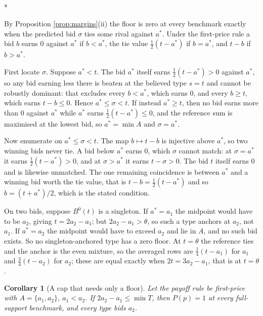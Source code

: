 \documentclass[12pt]{article}
\makeatletter
\newtheorem{corollary}{Corollary}
\theoremstyle{definition}
\renewenvironment{proof}[1][\proofname]{\par
  \pushQED{\qed}%
  \normalfont \topsep6\p@\@plus6\p@\relax
  \trivlist
  \item[\hskip\labelsep\itshape #1\@addpunct{.}]\mbox{}\\*
  \ignorespaces
}{%
  \popQED\endtrivlist\@endpefalse
}
\makeatother
\begin{document}
\begin{proof}[Proof of Corollary \ref{cor:fpmargins}]
By Proposition \ref{prop:margins}(ii) the floor is zero at every benchmark exactly when the predicted bid $\sigma$ ties some rival against $a^*$. Under the first-price rule a bid $b$ earns $0$ against $a^*$ if $b < a^*$, the tie value $\tfrac12(t - a^*)$ if $b = a^*$, and $t - b$ if $b > a^*$.

First locate $\sigma$. Suppose $a^* < t$. The bid $a^*$ itself earns $\tfrac12(t - a^*) > 0$ against $a^*$, so any bid earning less there is beaten at the believed type $s = t$ and cannot be robustly dominant: that excludes every $b < a^*$, which earns $0$, and every $b \ge t$, which earns $t - b \le 0$. Hence $a^* \le \sigma < t$. If instead $a^* \ge t$, then no bid earns more than $0$ against $a^*$ while $a^*$ earns $\tfrac12(t-a^*) \le 0$, and the reference sum is maximised at the lowest bid, so $a^* = \min A$ and $\sigma = a^*$.

Now enumerate on $a^* \le \sigma < t$. The map $b \mapsto t - b$ is injective above $a^*$, so two winning bids never tie. A bid below $a^*$ earns $0$, which $\sigma$ cannot match: at $\sigma = a^*$ it earns $\tfrac12(t-a^*) > 0$, and at $\sigma > a^*$ it earns $t - \sigma > 0$. The bid $t$ itself earns $0$ and is likewise unmatched. The one remaining coincidence is between $a^*$ and a winning bid worth the tie value, that is $t - b = \tfrac12(t - a^*)$ and so $b = (t + a^*)/2$, which is the stated condition.

On two bids, suppose $B^0(t)$ is a singleton. If $a^* = a_1$ the midpoint would have to be $a_2$, giving $t = 2a_2 - a_1$; but $2a_2 - a_1 > \theta$, so such a type anchors at $a_2$, not $a_1$. If $a^* = a_2$ the midpoint would have to exceed $a_2$ and lie in $A$, and no such bid exists. So no singleton-anchored type has a zero floor. At $t = \theta$ the reference ties and the anchor is the even mixture, so the averaged rows are $\tfrac14(t - a_1)$ for $a_1$ and $\tfrac34(t - a_2)$ for $a_2$; these are equal exactly when $2t = 3a_2 - a_1$, that is at $t = \theta$.
\end{proof}

\begin{corollary}[A cap that needs only a floor]\label{cor:floor}
Let the payoff rule be first-price with $A = \{a_1, a_2\}$, $a_1 < a_2$. If $2a_2 - a_1 \le \min T$, then $P(p) = 1$ at every full-support benchmark, and every type bids $a_2$.
\end{corollary}
\end{document}
